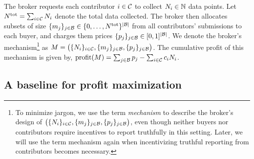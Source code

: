 The broker requests each contributor $i\in\mathcal{C}$ to collect $N_i \in \mathbb{N}$ data points.  
Let $N^{\rm tot} = \sum_{i\in\mathcal{C}} N_i$ denote the total data collected.  
The broker then allocates
subsets of size $\{m_j\}_{j\in\mathcal{B}} \in \{0,\dots,N^{\rm tot}\}^{|\mathcal{B}|}$ from all contributors' submissions to each buyer, and charges them prices $\{p_j\}_{j \in \mathcal{B}} \in [0,1]^{|\mathcal{B}|}$.  
We denote the broker's mechanism\footnote{To minimize jargon, we use the term \emph{mechanism} to describe the broker's design of $\big(\{N_i\}_{i\in\mathcal{C}}, \{m_j\}_{j\in\mathcal{B}}, \{p_j\}_{j \in \mathcal{B}}\big)$, even though neither buyers nor contributors require incentives to report truthfully in this setting. Later, we will use the term mechanism again when incentivizing truthful reporting from contributors becomes necessary.  
} as  
$M = \big(\{N_i\}_{i\in\mathcal{C}}, \{m_j\}_{j\in\mathcal{B}}, \{p_j\}_{j \in \mathcal{B}}\big)$.
The cumulative profit of this mechanism is given by,
${\rm profit}(M) = \sum_{j \in \mathcal{B}} p_j - \sum_{i \in \mathcal{C}} c_iN_i$.



\subsection{A baseline for profit maximization}
\label{sec:profitbaseline}


